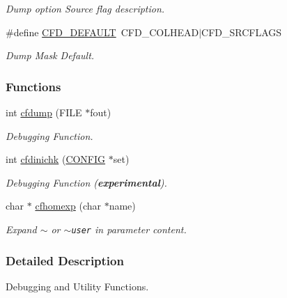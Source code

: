 \begin{CompactItemize}
\begin{CompactList}\small\item\em Dump option Source flag description. \item\end{CompactList}\item 
\hypertarget{group__advanced__features_g61cced010b3d926e37aafdf615951875}{
\#define \hyperlink{group__advanced__features_g61cced010b3d926e37aafdf615951875}{CFD\_\-DEFAULT}~CFD\_\-COLHEAD$|$CFD\_\-SRCFLAGS}
\label{group__advanced__features_g61cced010b3d926e37aafdf615951875}

\begin{CompactList}\small\item\em Dump Mask Default. \item\end{CompactList}\end{CompactItemize}
\subsubsection*{Functions}
\begin{CompactItemize}
\item 
int \hyperlink{group__advanced__features_gecfc8ee37366e1b36cb5aac0cc41ebdc}{cfdump} (FILE $\ast$fout)
\begin{CompactList}\small\item\em Debugging Function. \item\end{CompactList}\item 
int \hyperlink{group__advanced__features_g35e2c28f591ac71e3617c612233ecdd0}{cfdinichk} (\hyperlink{struct_c_o_n_f_i_g}{CONFIG} $\ast$set)
\begin{CompactList}\small\item\em Debugging Function ({\bf experimental}). \item\end{CompactList}\item 
char $\ast$ \hyperlink{group__advanced__features_gb6f874ac347d273dc45ad011808fe703}{cfhomexp} (char $\ast$name)
\begin{CompactList}\small\item\em Expand {\tt $\sim$} or {\tt $\sim$user} in parameter content. \item\end{CompactList}\end{CompactItemize}


\subsubsection{Detailed Description}
Debugging and Utility Functions. 

